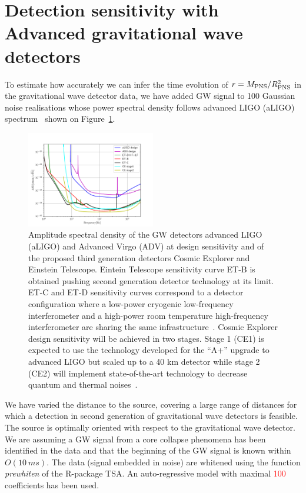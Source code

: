 \section{Detection sensitivity with Advanced gravitational wave detectors}
\label{sec:results}

To estimate how accurately we can infer the time evolution of $r=M_{\rm PNS}/R_{\rm PNS}^2$ in the
gravitational wave detector data, we have added  GW signal  to 
100 Gaussian noise realisations whose power spectral density follows  advanced LIGO (aLIGO)
spectrum~\cite{aLIGOsens:2018} shown on Figure~\ref{fig:spectrum}. 

\begin{figure}
 \centering
 \includegraphics[width=0.5\textwidth]{plots/spectrum}
 \caption{Amplitude spectral density of the GW detectors advanced LIGO (aLIGO) and Advanced Virgo (ADV) at design sensitivity and of the proposed third generation detectors Cosmic Explorer and Einstein Telescope. Eintein Telescope sensitivity curve ET-B is obtained pushing second generation detector technology at its limit. ET-C and ET-D sensitivity curves correspond to a detector configuration where a low-power cryogenic low-frequency interferometer and a high-power room temperature high-frequency interferometer are sharing the same infrastructure~\cite{Hild_20211}. Cosmic Explorer design sensitivity will be achieved in two stages. Stage 1 (CE1) is expected to use the technology developed for the “A+” upgrade to advanced LIGO but scaled up to a 40 km detector while stage 2 (CE2) will implement state-of-the-art technology to decrease quantum and thermal noises~\cite{reitze2019cosmic}. } \label{fig:spectrum}
\end{figure}

We have varied the distance to the source, covering a large
range of distances for which a detection in second generation of gravitational wave detectors
is feasible. The source is optimally oriented with
respect to the gravitational wave detector. We are assuming a GW signal from a core collapse
phenomena has been identified in the data and that the beginning of the GW signal is known within $O(10~ms)$.
The data (signal embedded in noise) are whitened using the function {\it prewhiten} of the R-package TSA.
An auto-regressive model with maximal \textcolor{red}{100} coefficients has been used.    

